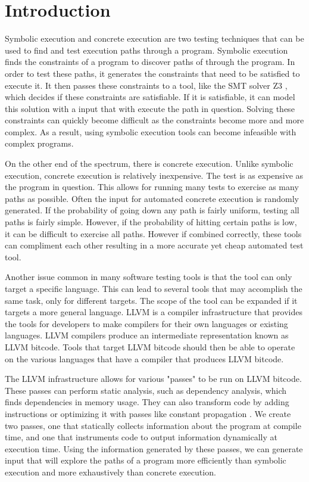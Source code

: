 \section{Introduction}

Symbolic execution and concrete execution are two testing techniques
that can be used to find and test execution paths through a program.
Symbolic execution finds the constraints of a program to discover paths
of through the program. In order to test these paths, it generates the constraints
that need to be satisfied to execute it. It then passes these constraints
to a tool, like the SMT solver Z3 \cite{10.1007/978-3-540-78800-3_24}, which
decides if these constraints are satisfiable. If it is satisfiable, it can model
this solution with a input that with execute the path in question. Solving
these constraints can quickly become difficult as the constraints become
more and more complex. As a result, using symbolic execution tools can become
infeasible with complex programs. 

On the other end of the spectrum, there is concrete execution. Unlike symbolic
execution, concrete execution is relatively inexpensive. The test is as 
expensive as the program in question. This allows
for running many tests to exercise as many paths as possible. Often the input
for automated concrete execution is randomly generated. If the probability of
going down any path is fairly uniform, testing all paths is fairly simple. 
However, if the probability of hitting certain paths is low, it can be 
difficult to exercise all paths. However if combined correctly, these tools
can compliment each other resulting in a more accurate yet cheap automated test tool. 

Another issue common in many software testing tools is that the tool can only 
target a specific language. This can lead to several tools that may 
accomplish the same task, only for different targets. The scope of the 
tool can be expanded if it targets a more general language. LLVM is
a compiler infrastructure that provides the tools for developers to
make compilers for their own languages or existing languages. LLVM
compilers produce an intermediate representation known as LLVM bitcode.
Tools that target LLVM bitcode should then be able to operate on the
various languages that have a compiler that produces LLVM bitcode.

The LLVM infrastructure allows for various "passes" to be run on 
LLVM bitcode. These passes can perform static analysis, such as 
dependency analysis, which finds dependencies in memory usage. They
can also transform code by adding instructions or optimizing it with
passes like constant propagation \cite{llvm}. We create two passes, one that statically
collects information about the program at compile time, and one that 
instruments code to output information dynamically at execution time.
Using the information generated by these passes, we can generate input that
will explore the paths of a program more efficiently than symbolic execution
and more exhaustively than concrete execution.

